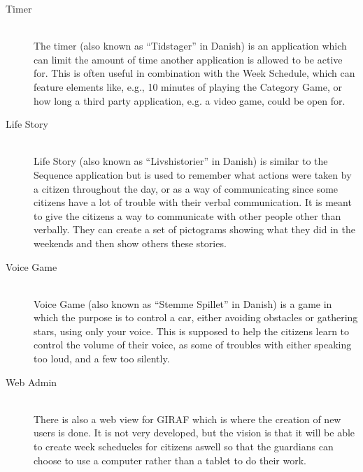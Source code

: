 \begin{description}
	\item[Timer] \hfill \\
	The timer (also known as ``Tidstager'' in Danish) is an application which can limit the amount of time another application is allowed to be active for.
	This is often useful in combination with the Week Schedule, which can feature elements like, e.g., 10 minutes of playing the Category Game, or how long a third party application, e.g. a video game, could be open for.
	\item[Life Story] \hfill \\
	Life Story (also known as ``Livshistorier'' in Danish) is similar to the Sequence application but is used to remember what actions were taken by a citizen throughout the day, or as a way of communicating since some citizens have a lot of trouble with their verbal communication. 
	It is meant to give the citizens a way to communicate with other people other than verbally. 
	They can create a set of pictograms showing what they did in the weekends and then show others these stories.
	\item[Voice Game] \hfill \\
	Voice Game (also known as ``Stemme Spillet'' in Danish) is a game in which the purpose is to control a car, either avoiding obstacles or gathering stars, using only your voice.
	This is supposed to help the citizens learn to control the volume of their voice, as some of troubles with either speaking too loud, and a few too silently.
	\item[Web Admin] \hfill \\
	There is also a web view for GIRAF which is where the creation of new users is done. 
	It is not very developed, but the vision is that it will be able to create week schedueles for citizens aswell so that the guardians can choose to use a computer rather than a tablet to do their work.

\end{description}
